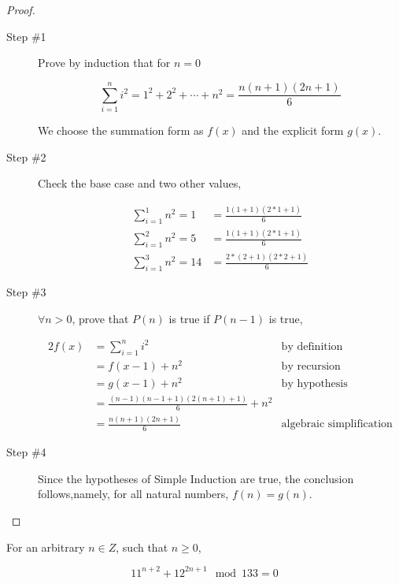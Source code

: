\documentclass[12pt]{scrartcl}
\begin{document}
\begin{proof}
    \begin{description}
        \item[Step \#1] Prove by induction that for $n = 0$

            \begin{equation*}
                \sum _{i = 1}^n i^2 = 1^2 + 2^2 + \cdots + n^2 = \frac{n(n + 1)(2n + 1)}{6}
            \end{equation*}

            We choose the summation form as $f(x)$ and the explicit form $g(x)$.

        \item[Step \#2] Check the base case and two other values,

           \begin{align*}
               \sum _{i = 1}^1 n^2 = 1 &= \frac{1(1 + 1)(2*1 + 1)}{6} \\
               \sum _{i = 1}^2 n^2 = 5 &= \frac{1(1 + 1)(2*1 + 1)}{6} \\
               \sum _{i = 1}^3 n^2 = 14 &= \frac{2*(2+1)(2*2 + 1)}{6}
           \end{align*}

       \item[Step \#3] $\forall n > 0$, prove that $P(n)$ is true if $P(n - 1)$ is true,

           \begin{alignat*}{2}
               f(x) &= \sum _{i = 1}^n i^2      &\text{by definition} \\
                    &= f(x - 1) + n^2           &\text{by recursion} \\
                    &= g(x - 1) + n^2           &\text{by hypothesis} \\
                    &= \frac{(n-1)(n - 1 + 1)(2(n + 1) + 1)}{6} + n^2 \\
                    &= \frac{n(n + 1)(2n + 1)}{6} &\text{algebraic simplification}
           \end{alignat*}

       \item[Step \#4]  Since the hypotheses of Simple Induction are true, the conclusion follows,namely, for all natural numbers, $f(n) = g(n)$.
    \end{description}
\end{proof}


\problem{}
\begin{theorem}
    For an arbitrary $n \in Z$, such that $n \geq 0$,

    \begin{equation*}
        11^{n + 2} + 12^{2n + 1} \mod 133 = 0
    \end{equation*}
\end{theorem}
\end{document}
